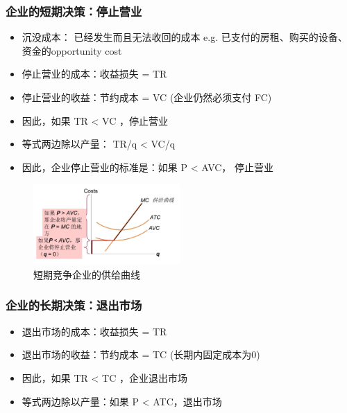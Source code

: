 \documentclass[12pt, a4paper]{article}
\begin{document}
\subsubsection{企业的短期决策：停止营业}

\begin{itemize}
  \item 沉没成本： 已经发生而且无法收回的成本  e.g. 已支付的房租、购买的设备、资金的opportunity cost

  \item 停止营业的成本：收益损失 = TR

  \item 停止营业的收益：节约成本 = VC (企业仍然必须支付 FC)

  \item 因此，如果 TR < VC ，停止营业

  \item 等式两边除以产量： TR/q < VC/q
  
  \item 因此，企业停止营业的标准是：如果 P < AVC， 停止营业
\end{itemize}

\begin{figure}[H] 
  \centering %
  \includegraphics[width=0.5\textwidth]{短期决策.png} 
  \caption{短期竞争企业的供给曲线} %
\end{figure}

\subsubsection{企业的长期决策：退出市场}

\begin{itemize}
  \item 退出市场的成本：收益损失 = TR

  \item 退出市场的收益：节约成本 = TC (长期内固定成本为0)

  \item 因此，如果 TR < TC ，企业退出市场

  \item 等式两边除以产量：如果 P < ATC，退出市场
\end{itemize}
\end{document}
